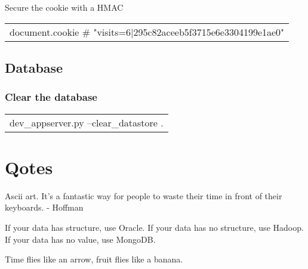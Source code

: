 \documentclass[12pt]{article}
\begin{document}
Secure the cookie with a HMAC



\begin{tabular}{l}
document.cookie $\#$ "visits=6|295c82aceeb5f3715e6e3304199e1ae0" \\
\end{tabular}



\subsection{Database}

\subsubsection{Clear the database}

\begin{tabular}{l}
dev\_appserver.py --clear\_datastore .
\end{tabular}



\section{Qotes}

Ascii art. It's a fantastic way for people to waste their time in front of their keyboards. - Hoffman

If your data has structure, use Oracle. If your data has no structure, use Hadoop. If your data has no value, use MongoDB.

Time flies like an arrow, fruit flies like a banana.






\printindex
\end{document}
